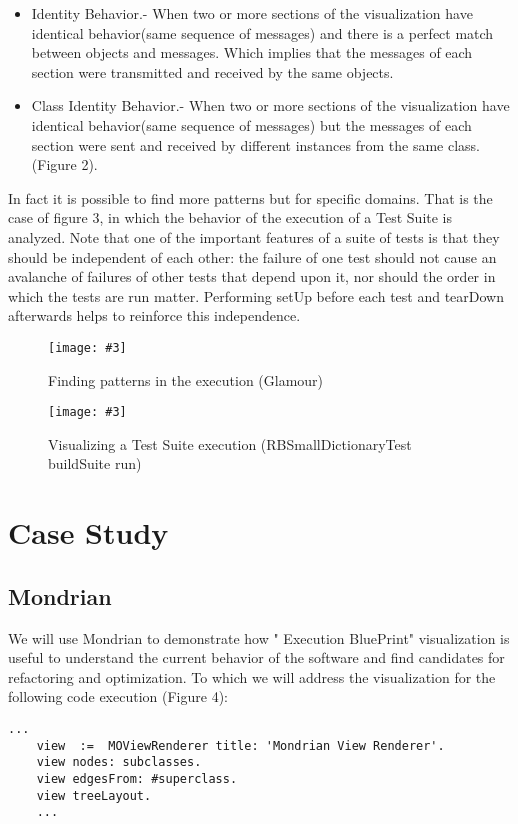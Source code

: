 \documentclass{sig-alternate}
\newcommand{\largefig}[4]{
	\begin{figure*}[#1]
		\centering
		\texttt{[image: \#3]}
		\caption{\label{fig:#3}#4}
	\end{figure*}}
\newcommand{\seclabel}[1]{\label{sec:#1}}
\begin{document}
\begin{itemize}
\item Identity Behavior.- When two or more sections of the visualization have identical behavior(same sequence of messages) and there is a perfect match between objects and messages. Which implies that the messages of each section were transmitted and received by the same objects.
\item Class Identity Behavior.- When two or more sections of the visualization have identical behavior(same sequence of messages) but the messages of each section	 were sent and received by different instances from the same class.(Figure 2).
\end{itemize}

In fact it is possible to find more patterns but for specific domains. That is the case of figure 3, in which the behavior of the execution of a Test Suite is analyzed. Note that one of the important features of a suite of tests is that they should be independent of each other: the failure of one test should not cause an avalanche of failures of other tests that depend upon it, nor should the order in which the tests are run matter. Performing setUp before each test and tearDown afterwards helps to reinforce this independence.


\largefig{}{1.0}{ChaskiPreview11}{Finding patterns in the execution (Glamour)}
\largefig{}{1.0}{ChaskiPreview8}{Visualizing a Test Suite execution (RBSmallDictionaryTest buildSuite run)}
\section{Case Study}\seclabel{case study}

\subsection{Mondrian}

We will use Mondrian to demonstrate how " Execution BluePrint" visualization is useful to understand the current behavior of the software and find candidates for refactoring and optimization. To which we will address the visualization for the following code execution (Figure 4):
\begin{lstlisting}[language=Smalltalk]
	...
	view  :=  MOViewRenderer title: 'Mondrian View Renderer'.
	view nodes: subclasses.
	view edgesFrom: #superclass.
	view treeLayout.
	...
\end{lstlisting}
\end{document}
